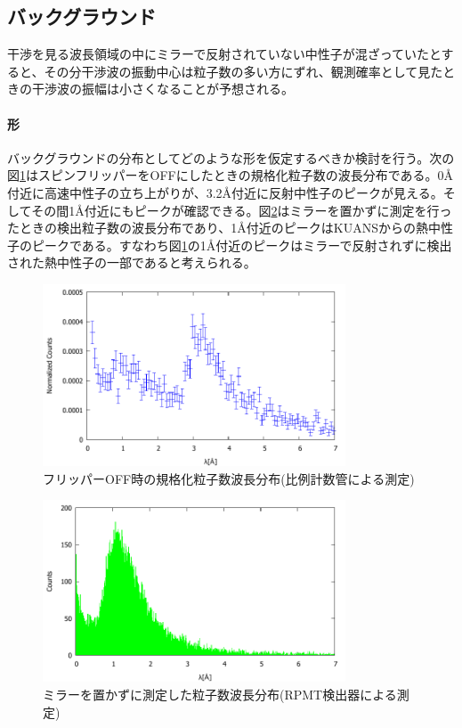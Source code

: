 \subsection{バックグラウンド}
干渉を見る波長領域の中にミラーで反射されていない中性子が混ざっていたとすると、その分干渉波の振動中心は粒子数の多い方にずれ、観測確率として見たときの干渉波の振幅は小さくなることが予想される。

\paragraph{形}
バックグラウンドの分布としてどのような形を仮定するべきか検討を行う。次の図\ref{Discussion_fig_flipperoff}はスピンフリッパーをOFFにしたときの規格化粒子数の波長分布である。0\AA 付近に高速中性子の立ち上がりが、3.2\AA 付近に反射中性子のピークが見える。そしてその間1\AA 付近にもピークが確認できる。図\ref{Discussion_fig_mirroroff}はミラーを置かずに測定を行ったときの検出粒子数の波長分布であり、1\AA 付近のピークはKUANSからの熱中性子のピークである。すなわち図\ref{Discussion_fig_flipperoff}の1\AA 付近のピークはミラーで反射されずに検出された熱中性子の一部であると考えられる。
\begin{figure}[H]
\centering
\includegraphics[width=9cm]{discussion/BG/flipperoff.pdf}
\caption{フリッパーOFF時の規格化粒子数波長分布(比例計数管による測定)}\label{Discussion_fig_flipperoff}
\end{figure}
\begin{figure}[H]
\centering
\includegraphics[width=9cm]{discussion/BG/mirroroff.pdf}
\caption{ミラーを置かずに測定した粒子数波長分布(RPMT検出器による測定)}\label{Discussion_fig_mirroroff}
\end{figure}

